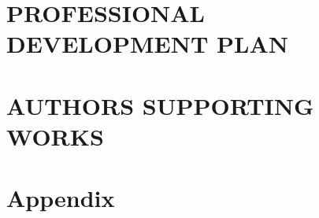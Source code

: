 \documentclass[10pt, english]{article}
\begin{document}
\section{PROFESSIONAL DEVELOPMENT PLAN}

\newpage
\section{AUTHORS SUPPORTING WORKS}

\newpage

\newpage
\section{Appendix}

\printbibliography
\end{document}
